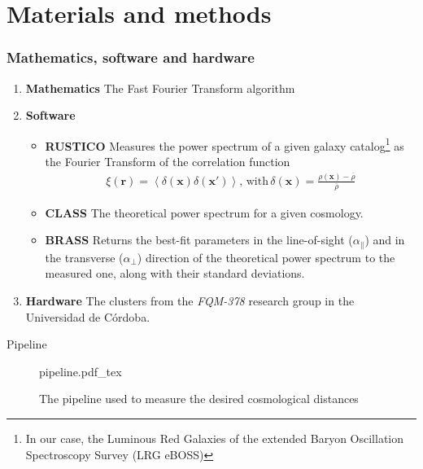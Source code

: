 \documentclass{beamer}
\newcommand{\incfig}[2][1]{%
    \def\svgwidth{#1\columnwidth}
    {#2.pdf_tex}
}
\begin{document}
\section{Materials and methods}
\begin{frame}[allowframebreaks]
\frametitle{Mathematics, software and hardware}

\begin{enumerate}
	\item \textbf{Mathematics} The Fast Fourier Transform algorithm
	\item \textbf{Software}
		\begin{itemize}
			\item \textbf{RUSTICO} Measures the power spectrum of a given galaxy catalog\footnote{In our case, the Luminous Red Galaxies of the extended Baryon Oscillation Spectroscopy Survey (LRG eBOSS)} as the Fourier Transform of the correlation function
			\begin{align}
				\xi(\textbf{r}) = \left<\delta(\textbf{x})\delta (\textbf{x}') \right>,\, \text{with}\, \delta(\textbf{x}) = \frac{\rho(\textbf{x}) - \overline{\rho}}{\overline{\rho}}
			\end{align}
		\item \textbf{CLASS} The theoretical power spectrum for a given cosmology.
		\item \textbf{BRASS} Returns the best-fit parameters in the line-of-sight ($\alpha_\parallel$) and in the transverse ($\alpha_\perp$) direction  of the theoretical power spectrum to the measured one, along with their standard deviations.
		\end{itemize}
	\item \textbf{Hardware} The clusters from the \textit{FQM-378} research group in the Universidad de Córdoba.

\end{enumerate}


\end{frame}

\begin{frame}{Pipeline}

	\begin{figure}[h]
		\centering
		\incfig{pipeline}
		\caption{The pipeline used to measure the desired cosmological distances}
		\label{fig:-figs-pipeline-pdf}
	\end{figure}
\end{frame}
\end{document}

